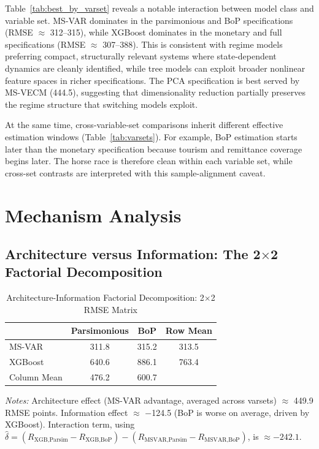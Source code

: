 \documentclass[12pt,a4paper]{article}
\begin{document}
Table~\ref{tab:best_by_varset} reveals a notable interaction between model class and variable set. MS-VAR dominates in the parsimonious and BoP specifications (RMSE $\approx$ 312--315), while XGBoost dominates in the monetary and full specifications (RMSE $\approx$ 307--388). This is consistent with regime models preferring compact, structurally relevant systems where state-dependent dynamics are cleanly identified, while tree models can exploit broader nonlinear feature spaces in richer specifications. The PCA specification is best served by MS-VECM (444.5), suggesting that dimensionality reduction partially preserves the regime structure that switching models exploit.

At the same time, cross-variable-set comparisons inherit different effective estimation windows (Table~\ref{tab:varsets}). For example, BoP estimation starts later than the monetary specification because tourism and remittance coverage begins later. The horse race is therefore clean within each variable set, while cross-set contrasts are interpreted with this sample-alignment caveat.

\section{Mechanism Analysis}
\label{sec:mechanism}

\subsection{Architecture versus Information: The 2$\times$2 Factorial Decomposition}

\begin{table}[htbp]
\centering
\caption{Architecture-Information Factorial Decomposition: 2$\times$2 RMSE Matrix}
\label{tab:did}
\begin{tabular}{lcc|c}
\toprule
& Parsimonious & BoP & Row Mean \\
\midrule
MS-VAR & 311.8 & 315.2 & 313.5 \\
XGBoost & 640.6 & 886.1 & 763.4 \\
\midrule
Column Mean & 476.2 & 600.7 & \\
\bottomrule
\end{tabular}
\begin{tablenotes}
\small
\item \textit{Notes:} Architecture effect (MS-VAR advantage, averaged across varsets) $\approx$ 449.9 RMSE points. Information effect $\approx$ $-$124.5 (BoP is worse on average, driven by XGBoost). Interaction term, using $\hat{\delta} = (R_{\text{XGB,Parsim}} - R_{\text{XGB,BoP}}) - (R_{\text{MSVAR,Parsim}} - R_{\text{MSVAR,BoP}})$, is $\approx -242.1$.
\end{tablenotes}
\end{table}
\end{document}

